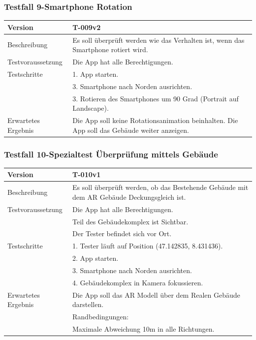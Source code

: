 \documentclass[a4paper]{scrreprt}
\begin{document}
\subsubsection{Testfall 9-Smartphone Rotation}
\begin{tabularx}{\textwidth}{|l|X|}
\hline 
	Version &
	T-009v2 \\ 
\hline 
	Beschreibung & 
	Es soll überprüft werden wie das Verhalten ist, wenn das Smartphone rotiert wird. \\ 
\hline 
	Testvoraussetzung &
	Die App hat alle Berechtigungen. \\ 
\hline 
	Testschritte & 
		1. App starten. \\ &
		3. Smartphone nach Norden ausrichten. \\ &
		3. Rotieren des Smartphones um 90 Grad (Portrait auf Landscape). \\
\hline
	Erwartetes Ergebnis &
	Die App soll keine Rotationsanimation beinhalten. Die App soll das Gebäude weiter anzeigen. \\ 
\hline 
\end{tabularx}
\subsubsection{Testfall 10-Spezialtest Überprüfung mittels Gebäude}
\begin{tabularx}{\textwidth}{|l|X|}
\hline 
	Version &
	T-010v1 \\ 
\hline 
	Beschreibung & 
	Es soll überprüft werden, ob das Bestehende Gebäude mit dem AR Gebäude Deckungsgleich ist. \\ 
\hline 
	Testvoraussetzung &
	Die App hat alle Berechtigungen. \\ &
	Teil des Gebäudekomplex ist Sichtbar. \\ &
	Der Tester befindet sich vor Ort. \\ 
\hline 
	Testschritte & 
		1. Tester läuft auf Position (47.142835, 8.431436). \\ &
		2. App starten. \\ &
		3. Smartphone nach Norden ausrichten. \\ &
		4. Gebäudekomplex in Kamera fokussieren. \\
\hline
	Erwartetes Ergebnis &
	Die App soll das AR Modell über dem Realen Gebäude darstellen. \\ &
	Randbedingungen: \\ &
		Maximale Abweichung 10m in alle Richtungen.\\ 
\hline 
\end{tabularx}
\end{document}

